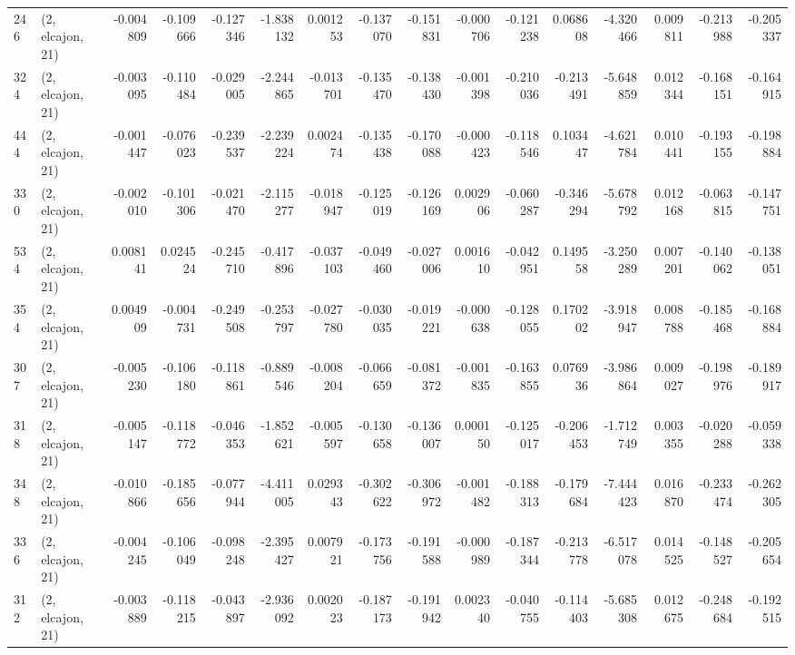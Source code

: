 \begin{tabular}{llrrrrrrrrrrrrrr}
246 &  (2, elcajon, 21) &  -0.004809 & -0.109666 & -0.127346 &   -1.838132 &  0.001253 &  -0.137070 & -0.151831 & -0.000706 & -0.121238 &  0.068608 &   -4.320466 &  0.009811 & -0.213988 & -0.205337 \\
324 &  (2, elcajon, 21) &  -0.003095 & -0.110484 & -0.029005 &   -2.244865 & -0.013701 &  -0.135470 & -0.138430 & -0.001398 & -0.210036 & -0.213491 &   -5.648859 &  0.012344 & -0.168151 & -0.164915 \\
444 &  (2, elcajon, 21) &  -0.001447 & -0.076023 & -0.239537 &   -2.239224 &  0.002474 &  -0.135438 & -0.170088 & -0.000423 & -0.118546 &  0.103447 &   -4.621784 &  0.010441 & -0.193155 & -0.198884 \\
330 &  (2, elcajon, 21) &  -0.002010 & -0.101306 & -0.021470 &   -2.115277 & -0.018947 &  -0.125019 & -0.126169 &  0.002906 & -0.060287 & -0.346294 &   -5.678792 &  0.012168 & -0.063815 & -0.147751 \\
534 &  (2, elcajon, 21) &   0.008141 &  0.024524 & -0.245710 &   -0.417896 & -0.037103 &  -0.049460 & -0.027006 &  0.001610 & -0.042951 &  0.149558 &   -3.250289 &  0.007201 & -0.140062 & -0.138051 \\
354 &  (2, elcajon, 21) &   0.004909 & -0.004731 & -0.249508 &   -0.253797 & -0.027780 &  -0.030035 & -0.019221 & -0.000638 & -0.128055 &  0.170202 &   -3.918947 &  0.008788 & -0.185468 & -0.168884 \\
307 &  (2, elcajon, 21) &  -0.005230 & -0.106180 & -0.118861 &   -0.889546 & -0.008204 &  -0.066659 & -0.081372 & -0.001835 & -0.163855 &  0.076936 &   -3.986864 &  0.009027 & -0.198976 & -0.189917 \\
318 &  (2, elcajon, 21) &  -0.005147 & -0.118772 & -0.046353 &   -1.852621 & -0.005597 &  -0.130658 & -0.136007 &  0.000150 & -0.125017 & -0.206453 &   -1.712749 &  0.003355 & -0.020288 & -0.059338 \\
348 &  (2, elcajon, 21) &  -0.010866 & -0.185656 & -0.077944 &   -4.411005 &  0.029343 &  -0.302622 & -0.306972 & -0.001482 & -0.188313 & -0.179684 &   -7.444423 &  0.016870 & -0.233474 & -0.262305 \\
336 &  (2, elcajon, 21) &  -0.004245 & -0.106049 & -0.098248 &   -2.395427 &  0.007921 &  -0.173756 & -0.191588 & -0.000989 & -0.187344 & -0.213778 &   -6.517078 &  0.014525 & -0.148527 & -0.205654 \\
312 &  (2, elcajon, 21) &  -0.003889 & -0.118215 & -0.043897 &   -2.936092 &  0.002023 &  -0.187173 & -0.191942 &  0.002340 & -0.040755 & -0.114403 &   -5.685308 &  0.012675 & -0.248684 & -0.192515 \\

\end{tabular}
